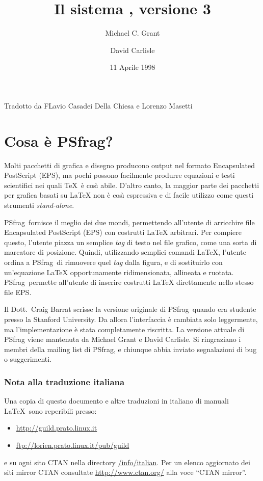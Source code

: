 \documentclass[a4paper,11pt]{ltxguide}
\title{Il sistema \pfg, versione 3}
\author{Michael C. Grant \and David Carlisle\\
        \netaddress{psfrag@rascals.stanford.edu}\ndt{Questo indirizzo 
non \`e pi\`u attivo}}
\date{11 Aprile 1998}
\let\pkg\textsf
\newcommand{\pfg}{\pkg{PSfrag}}
\begin{document}
\maketitle
\begin{center}
Tradotto da FLavio Casadei Della Chiesa e Lorenzo Masetti
\end{center}
\tableofcontents

\section{Cosa \`e \pfg?}

Molti pacchetti di grafica e disegno producono output nel formato
Encapsulated PostScript (EPS), ma pochi possono facilmente produrre
equazioni e testi scientifici nei quali \TeX\  \`e cos\`{\i}
abile. D'altro canto, la maggior parte dei pacchetti per grafica
basati su \LaTeX{}  non \`e cos\`{\i} espressiva e di facile
utilizzo come questi strumenti \emph{stand-alone}.

\pfg\ fornisce il meglio dei due mondi, permettendo all'utente di
arricchire file Encapsulated PostScript (EPS) con costrutti
\LaTeX{} arbitrari.
Per compiere questo, l'utente piazza un semplice \emph{tag} 
di testo
nel file grafico, come una sorta di marcatore di posizione. 
Quindi, utilizzando semplici comandi \LaTeX{}, l'utente ordina a
 \pfg\ di rimuovere quel \emph{tag} dalla figura, e di sostituirlo con
un'equazione \LaTeX{} opportunamente ridimensionata, allineata e ruotata.
\pfg\ permette all'utente di inserire costrutti \LaTeX{} direttamente 
nello stesso file EPS. 

Il Dott.~Craig Barrat scrisse la versione originale di \pfg\ quando
era studente presso la Stanford University. 
Da allora l'interfaccia
\`e cambiata solo leggermente, ma l'implementazione \`e stata completamente
riscritta. La versione attuale di \pfg{} viene mantenuta da Michael Grant
e David Carlisle. Si ringraziano i membri della mailing
list di \pfg{}, e chiunque abbia 
inviato segnalazioni di bug o suggerimenti.

\subsubsection*{Nota alla traduzione italiana}
Una copia di questo documento e altre traduzioni in italiano di
manuali \LaTeX\ sono reperibili presso:
\begin{itemize}
\item\url{http://guild.prato.linux.it}
\item\url{ftp://lorien.prato.linux.it/pub/guild}
\end{itemize}
e su ogni sito CTAN nella directory \url{/info/italian}.  Per un
elenco aggiornato dei siti mirror CTAN consultate
\url{http://www.ctan.org/} alla voce ``CTAN mirror''.
\end{document}
